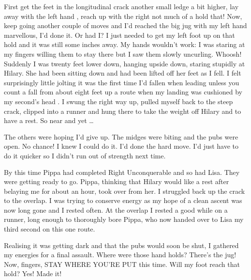 \documentclass[a5paper,openany,font 10pt]{scrbook}
\begin{document}
First get the feet in the longitudinal crack   another small
ledge a bit higher, lay away with the left hand , reach up with
the right   not much of a hold that! Now, keep going   another
couple of moves and I'd reached the big jug with my left hand
marvellous, I'd done it. Or had I? I just needed to get  my left
foot up on that hold and it was still some inches away. My hands
wouldn't work: I was staring at my fingers willing them to stay
there but I saw them slowly uncurling. Whoosh! Suddenly I was
twenty feet lower down, hanging upside down, staring stupidly at
Hilary. She had been sitting down and had been lifted off her
feet as I fell. I felt surprisingly little jolting  it was the
first time I'd fallen when leading unless you count a fall from
about eight feet up a route when my landing was cushioned by my
second's head . I swung the right way up, pulled myself back to
the steep crack, clipped into a runner and hung there to take the
weight off Hilary and to have a rest. So near and yet \ldots{}

The others were hoping I'd give up. The midges were biting
and the pubs were open. No chance! I knew I could do it. I'd done
the hard move. I'd just have to do it quicker so I didn't run out
of strength next time.

By this time Pippa had completed  Right Unconquerable  and so
had Lisa. They were getting ready to go. Pippa, thinking that
Hilary would like a rest after belaying me for about an hour,
took over from her. I struggled back up the crack to the overlap.
I was trying to conserve energy as my hope of a clean ascent was
now long gone and I rested often. At the overlap I rested a good
while on a runner, long enough to thoroughly bore Pippa, who now
handed over to Lisa   my third second on this one route.

Realising it was getting dark and that the pubs would soon
be shut, I gathered my energies for a final assault. Where were
those hand holds? There's the jug! Now, fingers, STAY WHERE
YOU'RE PUT this time. Will my foot reach that hold? Yes! Made it!
\end{document}
